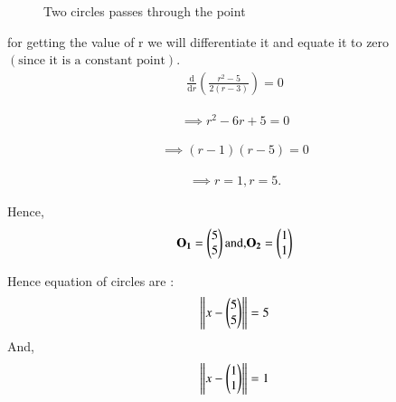 \documentclass[journal,12pt,twocolumn]{IEEEtran}
\begin{document}
\begin{figure}[!htb]
	\centering
	\resizebox{\columnwidth}{!}{}
	\caption{Two circles passes through the point}
\end{figure}




for getting the value of r we will differentiate it and equate it to zero $\left(\text{since it is a constant point}\right)$.
\begin{align}
\frac{\mathrm{d} }{\mathrm{d} r}\left ( \frac{r^2 - 5 }{2 \left(r - 3\right)} \right ) = 0
\end{align}

\begin{align}
\implies r^2 - 6r +5 = 0
\end{align}


\begin{align}
\implies \left( r -1\right) \left( r- 5\right) = 0
\end{align}

\begin{align}
\implies r = 1, r = 5.
\end{align}

Hence,
\begin{align}
\mathbf{O_1} = \begin{pmatrix}5 \\ 5 \\\end{pmatrix} \text{and,}  \mathbf{O_2} = \begin{pmatrix}1 \\ 1 \\\end{pmatrix}
\end{align}

Hence equation of circles are :
\begin{align}
\left\lVert x - \begin{pmatrix}5 \\ 5 \\\end{pmatrix}\right\rVert = 5
\end{align}
And,
\begin{align}
\left\lVert x - \begin{pmatrix}1 \\ 1 \\\end{pmatrix}\right\rVert = 1
\end{align}
\end{document}
